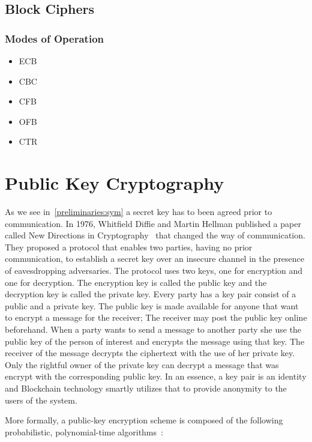 \subsection{Block Ciphers}
\label{preliminaries:sym:block}

\subsubsection{Modes of Operation}
\label{preliminaries:sym:modes}

\begin{itemize}
  \item ECB
  \item CBC
  \item CFB
  \item OFB
  \item CTR
\end{itemize}

\section{Public Key Cryptography}
\label{preliminaries:pub}

As we see in~\ref{preliminaries:sym} a secret key has to been agreed prior to communication. In 1976, Whitfield Diffie and Martin Hellman published a paper called New Directions in Cryptography~\cite{Diffie:2006:NDC:2263321.2269104} that changed the way of communication. They proposed a protocol that enables two parties, having no prior communication, to establish a secret key over an insecure channel in the presence of eavesdropping adversaries. The protocol uses two keys, one for encryption and one for decryption. The encryption key is called the public key and the decryption key is called the private key. Every party has a key pair consist of a public and a private key. The public key is made available for anyone that want to encrypt a message for the receiver; The receiver may post the public key online beforehand. When a party wants to send a message to another party she use the public key of the person of interest and encrypts the message using that key. The receiver of the message decrypts the ciphertext with the use of her private key. Only the rightful owner of the private key can decrypt a message that was encrypt with the corresponding public key. In an essence, a key pair is an identity and Blockchain technology smartly utilizes that to provide anonymity to the users of the system.

More formally, a public-key encryption scheme is composed of the following probabilistic, polynomial-time algorithms~\cite{Katz:2014:IMC:2700550, kiagias:crypto}:

